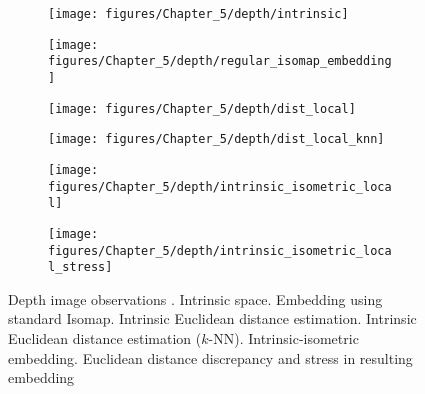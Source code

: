 	\begin{figure}[h]
		\begin{centering}
			\begin{subfigure}[t]{0.47\columnwidth}
				\texttt{[image: figures/Chapter\_5/depth/intrinsic]}
				\caption{\label{fig:4a}}
			\end{subfigure}\hfill
			\begin{subfigure}[t]{0.47\columnwidth}
				\texttt{[image: figures/Chapter\_5/depth/regular\_isomap\_embedding]}
				\caption{\label{fig:4b}}
			\end{subfigure}
		\end{centering}
		\begin{centering}
			\begin{subfigure}[t]{0.47\columnwidth}
				\texttt{[image: figures/Chapter\_5/depth/dist\_local]}
				\captionsetup{justification=centering}
				\caption{\label{fig:4c}}
			\end{subfigure}\hfill
			\begin{subfigure}[t]{0.47\columnwidth}
				\texttt{[image: figures/Chapter\_5/depth/dist\_local\_knn]}
				\caption{\label{fig:4d}}
			\end{subfigure}
		\end{centering}
		\begin{centering}
			\begin{subfigure}[t]{0.47\columnwidth}%
				\texttt{[image: figures/Chapter\_5/depth/intrinsic\_isometric\_local]}
				\caption{\label{fig:4e} \label{fig:bend2}}
			\end{subfigure}\hfill
			\begin{subfigure}[t]{0.47\columnwidth}
				\texttt{[image: figures/Chapter\_5/depth/intrinsic\_isometric\_local\_stress]}
				\caption{\label{fig:4f}}
			\end{subfigure}
		\end{centering}
		\caption{Depth image observations \label{fig:Depth-image-observations}. 
			\protect{} Intrinsic space. 
			\protect{} Embedding using standard Isomap. 
			\protect{} Intrinsic Euclidean distance estimation. 
			\protect{} Intrinsic Euclidean distance estimation ($k$-NN). 
			\protect{} Intrinsic-isometric embedding. 
			\protect{} Euclidean distance discrepancy and stress in resulting embedding}
	\end{figure}

